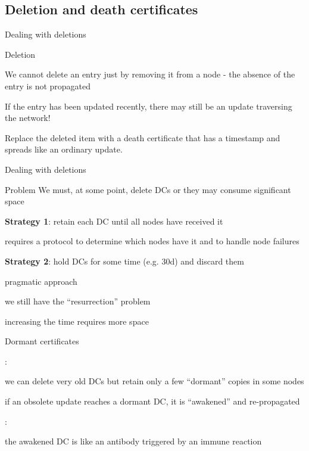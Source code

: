 \subsection{Deletion and death certificates}

\begin{frame}{Dealing with deletions}

\begin{block}{Deletion}
\BI
\item We cannot delete an entry just by removing it from a node - the absence
of the entry is not propagated
\item If the entry has been updated recently, there may still be an update
traversing the network!
\EI
\end{block}

\begin{definition}
Replace the deleted item with a \alert{death certificate} that has a timestamp
and spreads like an ordinary update.
\end{definition}

\end{frame}

\begin{frame}{Dealing with deletions}

\begin{block}{Problem}
We must, at some point, delete DCs or they may consume significant space
\end{block}

\BIL
\item \textbf{Strategy 1}: retain each DC until all nodes have received it
\BI
\item requires a protocol to determine which nodes have it and to handle node failures
\EI

\item \textbf{Strategy 2}: hold DCs for some time (e.g. 30d) and discard them
\BI
\item pragmatic approach
\item we still have the “resurrection” problem
\item increasing the time requires more space
\EI
\EIL

\end{frame}

\begin{frame}{Dormant certificates}

:

\BI
\item we can delete very old DCs but retain only a few “dormant” copies in some nodes
\item if an obsolete update reaches a dormant DC, it is “awakened” and re-propagated
\EI

\bigskip
{}:
 
\BI
\item the awakened DC is like an antibody triggered by an immune reaction
\EI

\end{frame}

